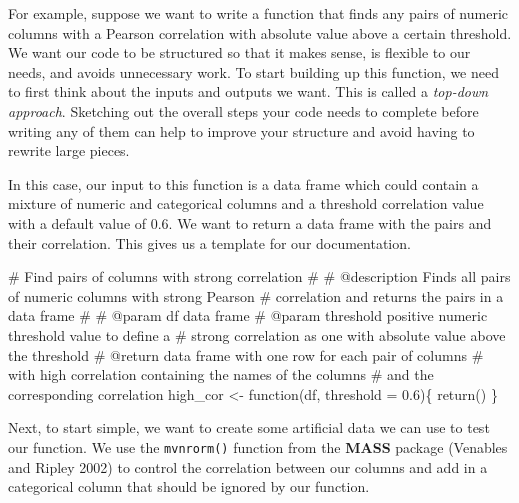 \documentclass[
  letterpaper,
]{latex/krantz}
\makeatletter
\newenvironment{Shaded}{\begin{snugshade}}{\end{snugshade}}
\newcommand{\AttributeTok}[1]{\textcolor[rgb]{0.40,0.45,0.13}{#1}}
\newcommand{\CommentTok}[1]{\textcolor[rgb]{0.37,0.37,0.37}{#1}}
\newcommand{\ControlFlowTok}[1]{\textcolor[rgb]{0.00,0.23,0.31}{#1}}
\newcommand{\FloatTok}[1]{\textcolor[rgb]{0.68,0.00,0.00}{#1}}
\newcommand{\FunctionTok}[1]{\textcolor[rgb]{0.28,0.35,0.67}{#1}}
\newcommand{\NormalTok}[1]{\textcolor[rgb]{0.00,0.23,0.31}{#1}}
\newcommand{\OtherTok}[1]{\textcolor[rgb]{0.00,0.23,0.31}{#1}}
\newenvironment{kframe}{%
\medskip{}
\setlength{\fboxsep}{.8em}
 \def\at@end@of@kframe{}%
 \ifinner\ifhmode%
  \def\at@end@of@kframe{\end{minipage}}%
  \begin{minipage}{\columnwidth}%
 \fi\fi%
 \def\FrameCommand##1{\hskip\@totalleftmargin \hskip-\fboxsep
 \colorbox{shadecolor}{##1}\hskip-\fboxsep
     \hskip-\linewidth \hskip-\@totalleftmargin \hskip\columnwidth}%
 \MakeFramed {\advance\hsize-\width
   \@totalleftmargin\z@ \linewidth\hsize
   \@setminipage}}%
 {\par\unskip\endMakeFramed%
 \at@end@of@kframe}
\renewenvironment{Shaded}{\begin{kframe}}{\end{kframe}}
\makeatother
\begin{document}
For example, suppose we want to write a function that finds any pairs of
numeric columns with a Pearson correlation with absolute value above a
certain threshold. We want our code to be structured so that it makes
sense, is flexible to our needs, and avoids unnecessary work. To start
building up this function, we need to first think about the inputs and
outputs we want. This is called a \emph{top-down
approach}. Sketching out the overall steps
your code needs to complete before writing any of them can help to
improve your structure and avoid having to rewrite large pieces.

In this case, our input to this function is a data frame which could
contain a mixture of numeric and categorical columns and a threshold
correlation value with a default value of 0.6. We want to return a data
frame with the pairs and their correlation. This gives us a template for
our documentation.

\begin{Shaded}
\begin{Highlighting}[]
\CommentTok{\#\textquotesingle{} Find pairs of columns with strong correlation}
\CommentTok{\#\textquotesingle{} }
\CommentTok{\#\textquotesingle{} @description Finds all pairs of numeric columns with strong Pearson }
\CommentTok{\#\textquotesingle{} correlation and returns the pairs in a data frame}
\CommentTok{\#\textquotesingle{} }
\CommentTok{\#\textquotesingle{} @param df data frame}
\CommentTok{\#\textquotesingle{} @param threshold positive numeric threshold value to define a }
\CommentTok{\#\textquotesingle{} strong correlation as one with absolute value above the threshold}
\CommentTok{\#\textquotesingle{} @return data frame with one row for each pair of columns}
\CommentTok{\#\textquotesingle{} with high correlation containing the names of the columns }
\CommentTok{\#\textquotesingle{} and the corresponding correlation}
\NormalTok{high\_cor }\OtherTok{\textless{}{-}} \ControlFlowTok{function}\NormalTok{(df, }\AttributeTok{threshold =} \FloatTok{0.6}\NormalTok{)\{}
  \FunctionTok{return}\NormalTok{()}
\NormalTok{\}}
\end{Highlighting}
\end{Shaded}

Next, to start simple, we want to create some artificial data we can use
to test our function. We use the
\texttt{mvnrorm()}
function from the \textbf{MASS} package (Venables
and Ripley 2002) to control the correlation between our columns and add
in a categorical column that should be ignored by our function.
\end{document}
